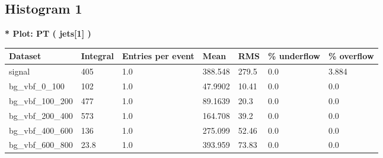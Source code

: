 \documentclass[a4paper, 10pt]{article}
\begin{document}
   \newpage
\subsection{ Histogram 1}

\textbf{* Plot: PT ( jets[1] ) }\\
   \begin{table}[H]
  \begin{center}
    \begin{tabular}{|m{23.0mm}|m{23.0mm}|m{18.0mm}|m{19.0mm}|m{19.0mm}|m{19.0mm}|m{19.0mm}|}
      \hline
      {\cellcolor{yellow}         Dataset}& {\cellcolor{yellow}         Integral}& {\cellcolor{yellow}         Entries per event}& {\cellcolor{yellow}         Mean}& {\cellcolor{yellow}         RMS}& {\cellcolor{yellow}         \% underflow}& {\cellcolor{yellow}         \% overflow}\\
      \hline
      {\cellcolor{white}         signal}& {\cellcolor{white}         405}& {\cellcolor{white}         1.0}& {\cellcolor{white}         388.548}& {\cellcolor{white}         279.5}& {\cellcolor{green}         0.0}& {\cellcolor{green}         3.884}\\
      \hline
      {\cellcolor{white}         bg\_vbf\_0\_100}& {\cellcolor{white}         102}& {\cellcolor{white}         1.0}& {\cellcolor{white}         47.9902}& {\cellcolor{white}         10.41}& {\cellcolor{green}         0.0}& {\cellcolor{green}         0.0}\\
      \hline
      {\cellcolor{white}         bg\_vbf\_100\_200}& {\cellcolor{white}         477}& {\cellcolor{white}         1.0}& {\cellcolor{white}         89.1639}& {\cellcolor{white}         20.3}& {\cellcolor{green}         0.0}& {\cellcolor{green}         0.0}\\
      \hline
      {\cellcolor{white}         bg\_vbf\_200\_400}& {\cellcolor{white}         573}& {\cellcolor{white}         1.0}& {\cellcolor{white}         164.708}& {\cellcolor{white}         39.2}& {\cellcolor{green}         0.0}& {\cellcolor{green}         0.0}\\
      \hline
      {\cellcolor{white}         bg\_vbf\_400\_600}& {\cellcolor{white}         136}& {\cellcolor{white}         1.0}& {\cellcolor{white}         275.099}& {\cellcolor{white}         52.46}& {\cellcolor{green}         0.0}& {\cellcolor{green}         0.0}\\
      \hline
      {\cellcolor{white}         bg\_vbf\_600\_800}& {\cellcolor{white}         23.8}& {\cellcolor{white}         1.0}& {\cellcolor{white}         393.959}& {\cellcolor{white}         73.83}& {\cellcolor{green}         0.0}& {\cellcolor{green}         0.0}\\

\end{tabular}
\end{center}
\end{table}
\end{document}
